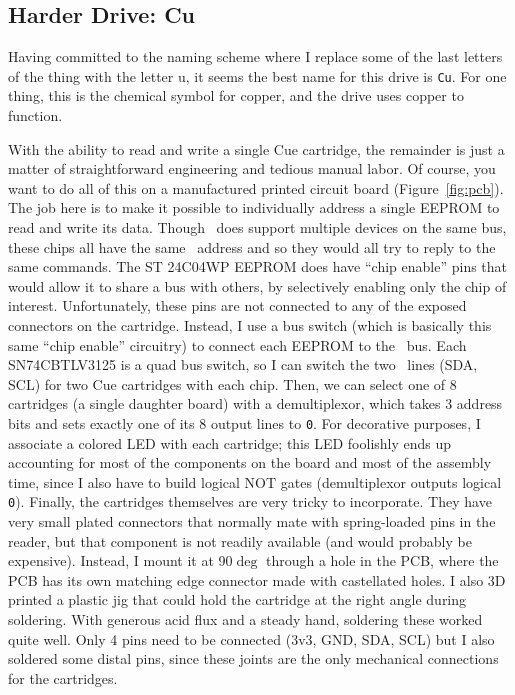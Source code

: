 \documentclass[twocolumn]{article}
\begin{document}
\subsection{Harder Drive: Cu}

Having committed to the naming scheme where I replace some of the last
letters of the thing with the letter u, it seems the best name for
this drive is {\tt Cu}. For one thing, this is the chemical symbol for
copper, and the drive uses copper to function.

With the ability to read and write a single Cue cartridge, the
remainder is just a matter of straightforward engineering and tedious
manual labor. Of course, you want to do all of this on a manufactured
printed circuit board (Figure~\ref{fig:pcb}). The job here is to make
it possible to individually address a single EEPROM to read and write
its data. Though \itwoc\ does support multiple devices on the same
bus, these chips all have the same \itwoc\ address and so they would
all try to reply to the same commands. The ST 24C04WP EEPROM does have
``chip enable'' pins that would allow it to share a bus with others,
by selectively enabling only the chip of interest. Unfortunately,
these pins are not connected to any of the exposed connectors on the
cartridge. Instead, I use a bus switch (which is basically this same
``chip enable'' circuitry) to connect each EEPROM to the \itwoc\ bus.
Each SN74CBTLV3125 is a quad bus switch, so I can switch the two
\itwoc\ lines (SDA, SCL) for two Cue cartridges with each chip. Then,
we can select one of 8 cartridges (a single daughter board) with a
demultiplexor, which takes 3 address bits and sets exactly one of its
8 output lines to {\tt 0}. For decorative purposes, I associate a
colored LED with each cartridge; this LED foolishly ends up accounting
for most of the components on the board and most of the assembly time,
since I also have to build logical NOT gates (demultiplexor outputs
logical {\tt 0}). Finally, the cartridges themselves are very tricky
to incorporate. They have very small plated connectors that normally
mate with spring-loaded pins in the reader, but that component is not
readily available (and would probably be expensive). Instead, I mount
it at 90$\deg$ through a hole in the PCB, where the PCB has its own
matching edge connector made with castellated holes. I also 3D printed
a plastic jig that could hold the cartridge at the right angle during
soldering. With generous acid flux and a steady hand, soldering these
worked quite well. Only 4 pins need to be connected (3v3, GND, SDA,
SCL) but I also soldered some distal pins, since these joints are the
only mechanical connections for the cartridges.
\end{document}
